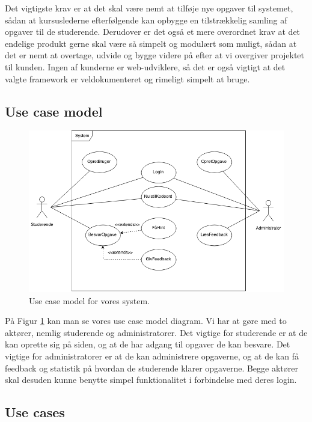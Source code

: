 \documentclass[12pt]{article}
\begin{document}
Det vigtigste krav er at det skal være nemt at tilføje nye opgaver til systemet, sådan at kursuslederne efterfølgende kan opbygge en tilstrækkelig samling af opgaver til de studerende. Derudover er det også et mere overordnet krav at det endelige produkt gerne skal være så simpelt og modulært som muligt, sådan at det er nemt at overtage, udvide og bygge videre på efter at vi overgiver projektet til kunden. Ingen af kunderne er web-udviklere, så det er også vigtigt at det valgte framework er veldokumenteret og rimeligt simpelt at bruge.

\subsection{Use case model}
\label{sub:use_case_model}
\begin{figure}[htpb]
  \centering
  \includegraphics[width=0.8\linewidth]{figures/UseCaseModel.png}
  \caption{Use case model for vores system.}
  \label{fig:use_case_model}
\end{figure}
På Figur \ref{fig:use_case_model} kan man se vores use case model diagram. Vi har at gøre med to aktører, nemlig studerende og administratorer. Det vigtige for studerende er at de kan oprette sig på siden, og at de har adgang til opgaver de kan besvare. Det vigtige for administratorer er at de kan administrere opgaverne, og at de kan få feedback og statistik på hvordan de studerende klarer opgaverne. Begge aktører skal desuden kunne benytte simpel funktionalitet i forbindelse med deres login.

\subsection{Use cases}
\label{sub:use_cases}
\end{document}
